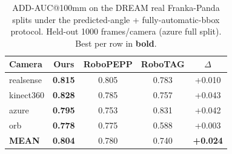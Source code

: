\begin{table}[t]
\centering
\caption{ADD-AUC@100mm on the DREAM real Franka-Panda splits under the
predicted-angle + fully-automatic-bbox protocol. Held-out 1000 frames/camera
(azure full split). Best per row in \textbf{bold}.}
\label{tab:dream}
\begin{tabular}{lcccc}
\toprule
Camera & \textbf{Ours} & RoboPEPP & RoboTAG & $\Delta$ \\
\midrule
realsense & \textbf{0.815} & 0.805 & 0.783 & +0.010 \\
kinect360 & \textbf{0.828} & 0.785 & 0.757 & +0.043 \\
azure     & \textbf{0.795} & 0.753 & 0.831 & +0.042 \\
orb       & \textbf{0.778} & 0.775 & 0.588 & +0.003 \\
\midrule
\textbf{MEAN} & \textbf{0.804} & 0.780 & 0.740 & \textbf{+0.024} \\
\bottomrule
\end{tabular}
\end{table}
